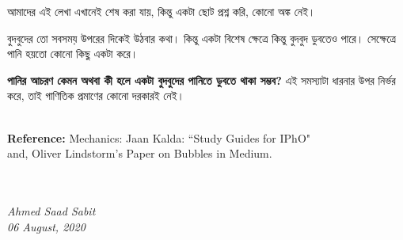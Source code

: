 \documentclass[11pt,a4paper]{article}
\begin{document}
\begin{tcolorbox}[breakable]
আমাদের এই লেখা এখানেই শেষ করা যায়, কিন্তু একটা ছোট প্রশ্ন করি, কোনো অঙ্ক নেই। 

বুদবুদের তো সবসময় উপরের দিকেই উঠবার কথা। কিন্তু একটা বিশেষ ক্ষেত্রে কিন্তু বুদবুদ ডুবতেও পারে। সেক্ষেত্রে পানি হয়তো কোনো কিছু একটা করে। 

\textbf{পানির আচরণ কেমন অথবা কী হলে একটা বুদবুদের পানিতে ডুবতে থাকা সম্ভব?} এই সমস্যাটা ধারনার উপর নির্ভর করে, তাই গাণিতিক প্রমাণের কোনো দরকারই নেই।    
\end{tcolorbox}
\
\
\\
\textbf{Reference:} Mechanics: Jaan Kalda: ``Study Guides for IPhO" \\
and, Oliver Lindstorm's Paper on Bubbles in Medium. 
\\
\
\\
\
\\
\begin{flushright}
\textit{Ahmed Saad Sabit} \\
\textit{06 August, 2020}
\end{flushright}
\end{document}
